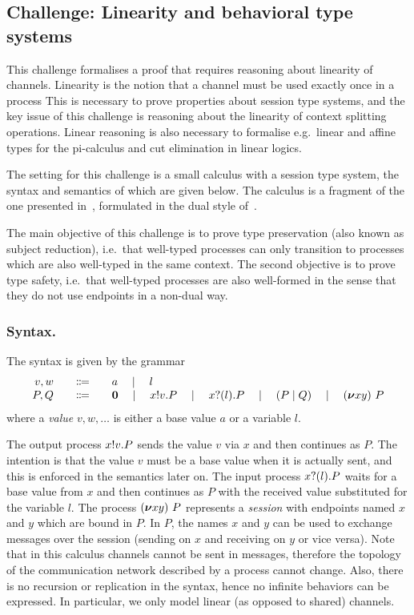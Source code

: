 \subsection{Challenge: Linearity and behavioral type systems}
\label{sec:challenge:linearity-beh-types}
This challenge formalises a proof that requires reasoning about linearity of channels.
Linearity is the notion that a channel must be used exactly once in a process
This is necessary to prove properties about session type systems, and the key
issue of this challenge is reasoning about the linearity of context splitting operations.
Linear reasoning is also necessary to formalise e.g.\ linear and affine types for the pi-calculus and cut elimination in linear logics.

The setting for this challenge is a small calculus with a session type
system, the syntax and semantics of which are given below. The
calculus is a fragment of the one presented in~\cite{Vasconcelos2012},
formulated in the dual style of~\cite{barber96tr}.

The main objective of this challenge is to prove type preservation (also
known as subject reduction), i.e.\ that well-typed
processes can only transition to processes which are also well-typed
in the same context.
The second objective is to prove type safety, i.e.\ that well-typed processes are also well-formed in the sense that they do not use endpoints in a non-dual way.

\subsubsection{Syntax.}
The syntax is given by the grammar
\[
\begin{array}{r@{\qquad}c@{\qquad}l}
  v,w & \Coloneqq & a \quad\mid\quad l \\
   P,Q & \Coloneqq & \Pend \quad\mid\quad \Pout{x}{v}{P} \quad\mid\quad \Pin{x}{l}{P} \quad\mid\quad \PBpar{P}{Q} \quad\mid\quad  \Presd{x}{y}{P}
\end{array}
\]
where a \emph{value} \( v, w, \dots \) is either a base value \( a \) or a variable \( l \).

The output process \( x ! v . P \) sends the value \( v \) via \( x \) and then continues as \( P \).
The intention is that the value \( v \) must be a base value when it is actually sent, and this is enforced in the semantics later on.
The input process \( x ? (l) . P \) waits for a base value from \( x \) and then continues as \( P \) with the received value substituted for the variable \( l \).
%
The process \( (\bm{\nu} xy)~P \) represents a \emph{session} with endpoints named \( x \) and \( y \) which are bound in \( P \). In \( P \), the names \( x \) and \( y \) can be used to exchange messages over the session (sending on \( x \) and receiving on \( y \) or vice versa).
%
%
Note that in this calculus channels cannot be sent in messages, therefore the topology of the communication network described by a process cannot change.
Also, there is no recursion or replication in the syntax, hence no infinite behaviors can be expressed. In particular, we only model linear (as opposed to shared) channels.

